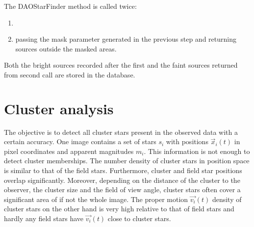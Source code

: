 \documentclass[letterpaper,10pt,english]{sphinxmanual}
\begin{document}
\sphinxAtStartPar
The DAOStarFinder method is called twice:
\begin{enumerate}
%
\item {} 

\item {} 
\sphinxAtStartPar
passing the mask parameter generated in the previous step and returning sources outside the masked areas.

\end{enumerate}

\sphinxAtStartPar
Both the bright sources recorded after the first and the faint sources returned from second call are stored in the database.


\chapter{Cluster analysis}
\label{\detokenize{NBodySimulation/Clustering:cluster-analysis}}\label{\detokenize{NBodySimulation/Clustering::doc}}
\sphinxAtStartPar
The objective is to detect all cluster stars present in the observed data with a certain accuracy.
One image contains a set of stars \(s_{i}\) with positions \(\vec{x}_{i}\left ( t \right )\) in pixel coordinates and apparent magnitudes \(m_{i}\).
This information is not enough to detect cluster memberships. The number density of cluster stars in position space is similar to that of the field stars.
Furthermore, cluster and field star positions overlap significantly.
Moreover, depending on the distance of the cluster to the observer, the cluster size and the field of view angle, cluster stars often cover a significant area of if not the whole image.
The proper motion \(\vec{v_{i}}(t)\) density of cluster stars on the other hand is very high relative to that of field stars and hardly any field stars have \(\vec{v_{i}}(t)\) close to cluster stars.
\end{document}
